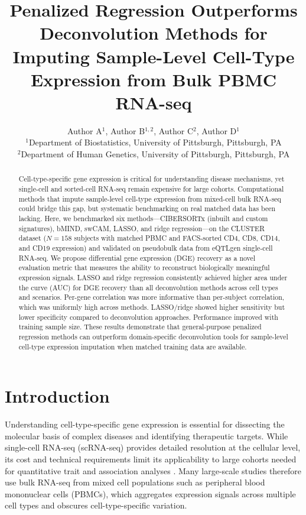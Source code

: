 \documentclass[12pt]{article}
\title{Penalized Regression Outperforms Deconvolution Methods for Imputing Sample-Level Cell-Type Expression from Bulk PBMC RNA-seq}
\author{Author A$^{1}$, Author B$^{1,2}$, Author C$^{2}$, Author D$^{1}$ \\
\small $^{1}$Department of Biostatistics, University of Pittsburgh, Pittsburgh, PA \\
\small $^{2}$Department of Human Genetics, University of Pittsburgh, Pittsburgh, PA}
\date{}
\begin{document}
\maketitle

\begin{abstract}
Cell-type-specific gene expression is critical for understanding disease mechanisms, yet single-cell and sorted-cell RNA-seq remain expensive for large cohorts. Computational methods that impute sample-level cell-type expression from mixed-cell bulk RNA-seq could bridge this gap, but systematic benchmarking on real matched data has been lacking. Here, we benchmarked six methods---CIBERSORTx (inbuilt and custom signatures), bMIND, swCAM, LASSO, and ridge regression---on the CLUSTER dataset ($N = 158$ subjects with matched PBMC and FACS-sorted CD4, CD8, CD14, and CD19 expression) and validated on pseudobulk data from eQTLgen single-cell RNA-seq. We propose differential gene expression (DGE) recovery as a novel evaluation metric that measures the ability to reconstruct biologically meaningful expression signals. LASSO and ridge regression consistently achieved higher area under the curve (AUC) for DGE recovery than all deconvolution methods across cell types and scenarios. Per-gene correlation was more informative than per-subject correlation, which was uniformly high across methods. LASSO/ridge showed higher sensitivity but lower specificity compared to deconvolution approaches. Performance improved with training sample size. These results demonstrate that general-purpose penalized regression methods can outperform domain-specific deconvolution tools for sample-level cell-type expression imputation when matched training data are available.
\end{abstract}

\section{Introduction}

Understanding cell-type-specific gene expression is essential for dissecting the molecular basis of complex diseases and identifying therapeutic targets. While single-cell RNA-seq (scRNA-seq) provides detailed resolution at the cellular level, its cost and technical requirements limit its applicability to large cohorts needed for quantitative trait and association analyses \citep{eqtlgen2019}. Many large-scale studies therefore use bulk RNA-seq from mixed cell populations such as peripheral blood mononuclear cells (PBMCs), which aggregates expression signals across multiple cell types and obscures cell-type-specific variation.
\end{document}
